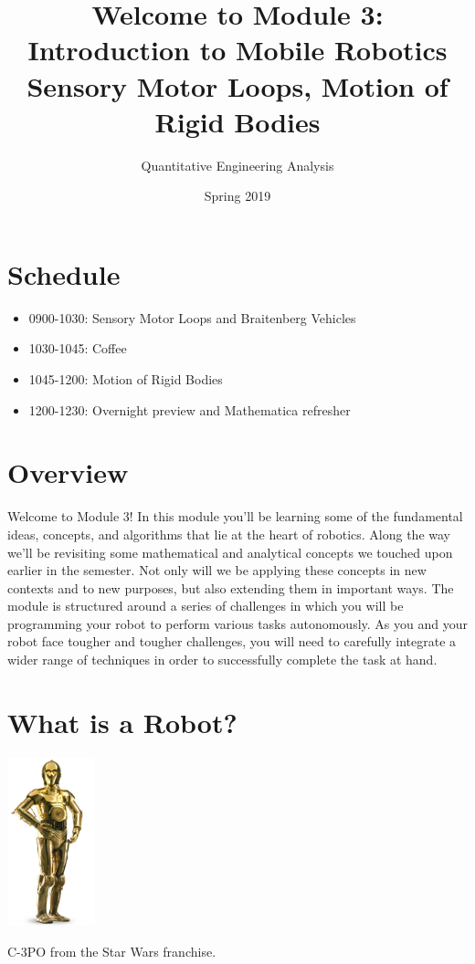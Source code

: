 \documentclass{tufte-handout}
\title{Welcome to Module 3: Introduction to Mobile Robotics \\
Sensory Motor Loops, Motion of Rigid Bodies }
\author{Quantitative Engineering Analysis}
\date{Spring 2019}
\begin{document}
\maketitle
\thispagestyle{firstpage}

\section{Schedule}
\begin{itemize}
\item 0900-1030: Sensory Motor Loops and Braitenberg Vehicles
\item 1030-1045: Coffee
\item 1045-1200: Motion of Rigid Bodies
\item 1200-1230: Overnight preview and Mathematica refresher
\end{itemize}

\section{Overview}

Welcome to Module 3!  In this module you'll be learning some of the fundamental ideas, concepts, and algorithms that lie at the heart of robotics.  Along the way we'll be revisiting some mathematical and analytical concepts we touched upon earlier in the semester.  Not only will we be applying these concepts in new contexts and to new purposes, but also extending them in important ways.  The module is structured around a series of challenges in which you will be programming your robot to perform various tasks autonomously.  As you and your robot face tougher and tougher challenges, you will need to carefully integrate a wider range of techniques in order to successfully complete the task at hand.

\section{What is a Robot?}
\begin{marginfigure}
\begin{center}
\includegraphics[width=1in]{figures/C-3PO_droid.png}
\end{center}
\caption{C-3PO from the Star Wars franchise.}
\end{marginfigure}
\end{document}
